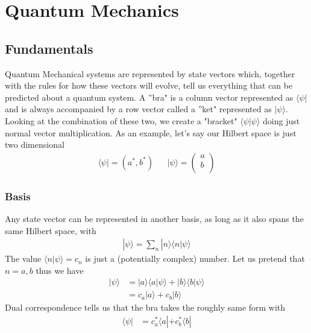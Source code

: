 


\chapter{Quantum Mechanics}


\section{Fundamentals}

Quantum Mechanical systems are represented by state vectors which, together with the rules for how these vectors will evolve, tell us everything that can be predicted about a quantum system. A ''bra" is a column vector represented as  $\langle  \psi| $ and is always accompanied by a row vector called a ''ket" represented as $| \psi \rangle$. Looking at the combination of these two, we create a "bracket" $\langle\psi|\psi\rangle$ doing just normal vector multiplication. As an example, let's say our Hilbert space is just two dimensional
\begin{align}
    \langle\psi| = (a^*,b^*) && |\psi\rangle = \left(
{\begin{array}{c}
a\\
b\\
\end{array}}
\right)
\end{align}

\subsection{Basis}
Any state vector can be represented in another basis, as long as it also spans the same Hilbert space, with 
\begin{align}
|\psi\rangle  = \sum_{n} |n\rangle\langle n|\psi\rangle
\end{align}
The value $\langle n|\psi\rangle = c_n$ is just a (potentially complex) number. Let us pretend that $n = a,b$ thus we have
\begin{align}\label{abbasis}
|\psi\rangle &= |a\rangle\langle a |\psi\rangle + |b\rangle\langle b |\psi\rangle \\
&= c_a|a\rangle + c_b|b\rangle
\end{align}
Dual correspondence tells us that the bra takes the roughly same form with
\begin{align}
\langle \psi | &= c_a^*\langle a| + c_b^*\langle b|
\end{align}


